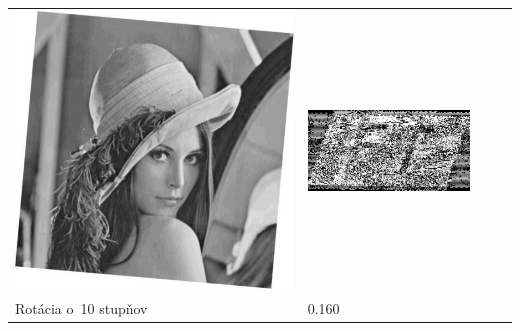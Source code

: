 \begin{table}[h]
\begin{tabular}{llcc}
\begin{minipage}[c]{.1\textwidth}
  \includegraphics[scale=0.1]{obrazky/rotation5}
\end{minipage}
 &
 \begin{minipage}[c]{.15\textwidth}
   \includegraphics[scale=0.25]{obrazky/rotation5-wm}
 \end{minipage} \\
Rotácia o~10 stupňov                   & 0.160 &
\begin{minipage}[c]{.1\textwidth}
\ 

\end{minipage}
\end{tabular}
\end{table}

